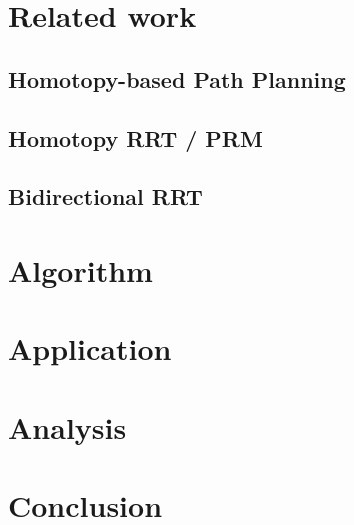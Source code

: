 \documentclass[letterpaper, 10 pt, conference]{ieeeconf}
\begin{document}
\section{Related work}
\label{sec:related_work}

\subsection{Homotopy-based Path Planning}

\cite{Hershberger199463}

\cite{AAAI101920}

\subsection{Homotopy RRT / PRM}

\cite{1041613}

\cite{Hernandez201544}

\subsection{Bidirectional RRT}

\cite{1041613}

\cite{Jordan.Perez.ea:CSAIL13}

\cite{starek2014bidirectional}

\section{Algorithm}
\label{sec:algorithm}

\section{Application}
\label{sec:application}

\section{Analysis}
\label{sec:analysis}

\section{Conclusion}
\label{sec:conclusion}



\end{document}
